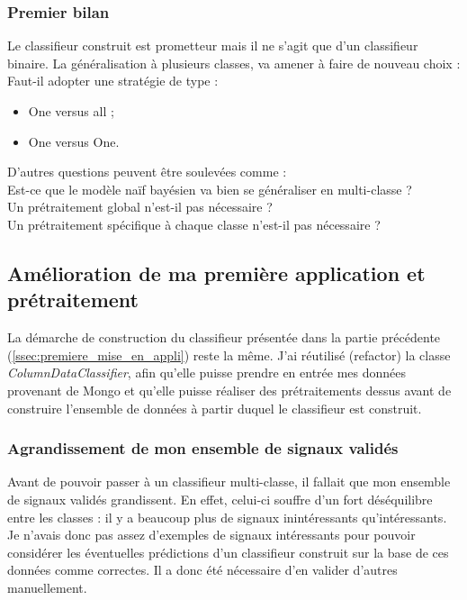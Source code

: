             \subsubsection{Premier bilan}
                Le classifieur construit est prometteur mais il ne s'agit que d'un classifieur binaire. La généralisation à plusieurs classes, va amener à faire de nouveau choix :\\
                Faut-il adopter une stratégie de type :
                \begin{itemize}
                    \item One versus all ;
                    \item One versus One.
                \end{itemize}
                D'autres questions peuvent être soulevées comme :\\
                Est-ce que le modèle naïf bayésien va bien se généraliser en multi-classe ?\\
                Un prétraitement global n'est-il pas nécessaire ?\\
                Un prétraitement spécifique à chaque classe n'est-il pas nécessaire ?\\

        \subsection{Amélioration de ma première application et prétraitement}
            La démarche de construction du classifieur présentée dans la partie précédente (\ref{ssec:premiere_mise_en_appli}) reste la même. J'ai réutilisé (refactor) la classe \textit{ColumnDataClassifier}, afin qu'elle puisse prendre en entrée mes données provenant de Mongo et qu'elle puisse réaliser des prétraitements dessus avant de construire l'ensemble de données à partir duquel le classifieur est construit.
            \subsubsection{Agrandissement de mon ensemble de signaux validés}
                Avant de pouvoir passer à un classifieur multi-classe, il fallait que mon ensemble de signaux validés grandissent. En effet, celui-ci souffre d'un fort déséquilibre entre les classes : il y a beaucoup plus de signaux inintéressants qu'intéressants. Je n'avais donc pas assez d'exemples de signaux intéressants pour pouvoir considérer les éventuelles prédictions d'un classifieur construit sur la base de ces données comme correctes. Il a donc été nécessaire d'en valider d'autres manuellement.

